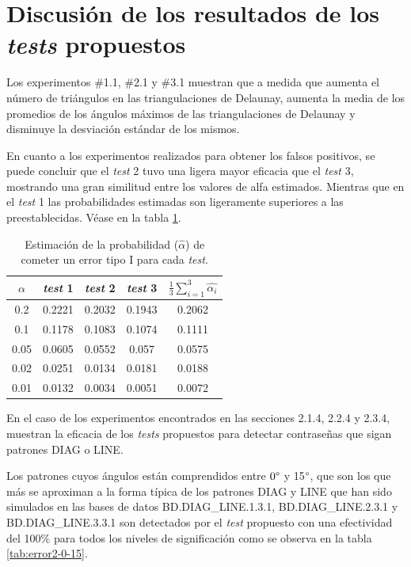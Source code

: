 \documentclass[12pt]{report}
\begin{document}
\section{Discusión de los resultados de los \textit{tests} propuestos}
Los experimentos \#1.1, \#2.1 y \#3.1 muestran que a medida que aumenta el número de triángulos en las triangulaciones de Delaunay, aumenta la media de los promedios de los ángulos máximos de las triangulaciones de Delaunay y disminuye la desviación estándar de los mismos. 

En cuanto a los experimentos realizados para obtener los falsos positivos, se puede concluir que el \textit{test} 2 tuvo una ligera mayor eficacia que el \textit{test} 3, mostrando una gran similitud entre los valores de alfa estimados. Mientras que en el \textit{test} 1 las probabilidades estimadas son ligeramente superiores a las preestablecidas. Véase en la tabla \ref{tab:error1}.
\begin{table}[h!]
	\centering
	\begin{tabular}{|c|ccc|c|}
		\hline
		$\alpha$& \textit{test} 1 & \textit{test} 2 & \textit{test} 3  & $\frac{1}{3} \sum_{i=1}^{3} \hat{\alpha_i}$  \\
		\hline
		0.2 &  0.2221    & 0.2032    &  0.1943 & 0.2062  \\
		0.1 &  0.1178    & 0.1083    &  0.1074 & 0.1111  \\
		0.05&  0.0605    & 0.0552    &  0.057  & 0.0575  \\
		0.02&  0.0251    & 0.0134    &  0.0181 & 0.0188  \\
		0.01&  0.0132    & 0.0034    &  0.0051 & 0.0072  \\
		\hline
	\end{tabular}
	\caption{Estimación de la probabilidad ($\hat{\alpha}$) de cometer un error tipo I para cada \textit{test}.}
	\label{tab:error1}
\end{table}

En el caso de los experimentos encontrados en las secciones 2.1.4, 2.2.4 y 2.3.4, muestran la eficacia de los \textit{tests} propuestos  para detectar contraseñas que sigan patrones DIAG o LINE.

Los patrones cuyos ángulos están comprendidos entre $0\degree$ y 15$\degree$, que son los que más se aproximan a la forma típica de los patrones DIAG y LINE que han sido simulados en las bases de datos BD.DIAG\_LINE.1.3.1, BD.DIAG\_LINE.2.3.1 y BD.DIAG\_LINE.3.3.1 son detectados por el \textit{test} propuesto con una efectividad del 100\% para todos los niveles de significación como se observa en la tabla \ref{tab:error2-0-15}.
\end{document}
